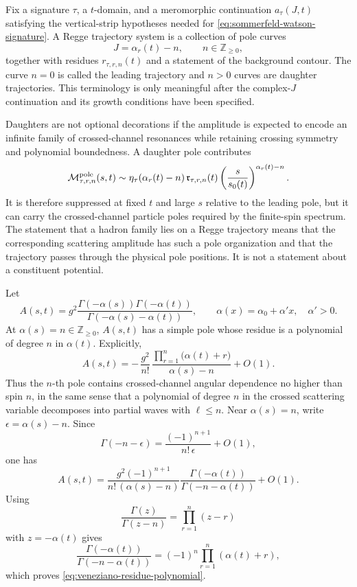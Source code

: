 \begin{definition}
\label{def:regge-trajectory-daughter-data}
Fix a signature \(\tau\), a \(t\)-domain, and a meromorphic continuation
\(a_\tau(J,t)\) satisfying the vertical-strip hypotheses needed for
\eqref{eq:sommerfeld-watson-signature}.  A Regge trajectory system is a
collection of pole curves
\[
  J=\alpha_r(t)-n,\qquad n\in \mathbb Z_{\ge0},
\]
together with residues \(r_{\tau,r,n}(t)\) and a statement of the background
contour.  The curve \(n=0\) is called the leading trajectory and \(n>0\)
curves are daughter trajectories.  This terminology is only meaningful after
the complex-\(J\) continuation and its growth conditions have been specified.
\end{definition}

Daughters are not optional decorations if the amplitude is expected to encode
an infinite family of crossed-channel resonances while retaining crossing
symmetry and polynomial boundedness.  A daughter pole contributes
\[
  \mathcal M_{\tau,r,n}^{\rm pole}(s,t)
  \sim
  \eta_\tau(\alpha_r(t)-n)\,
  \mathfrak r_{\tau,r,n}(t)
  \left(\frac{s}{s_0(t)}\right)^{\alpha_r(t)-n}.
\]
It is therefore suppressed at fixed \(t\) and large \(s\) relative to the
leading pole, but it can carry the crossed-channel particle poles required by
the finite-spin spectrum.  The statement that a hadron family lies on a Regge
trajectory means that the corresponding scattering amplitude has such a pole
organization and that the trajectory passes through the physical pole
positions.  It is not a statement about a constituent potential.

Let
\begin{equation}
  A(s,t)=g^2
  \frac{\Gamma(-\alpha(s))\Gamma(-\alpha(t))}
       {\Gamma(-\alpha(s)-\alpha(t))},
  \qquad
  \alpha(x)=\alpha_0+\alpha' x,\quad \alpha'>0 .
  \label{eq:veneziano-beta-amplitude}
\end{equation}
At \(\alpha(s)=n\in\mathbb Z_{\ge0}\), \(A(s,t)\) has a simple pole whose
residue is a polynomial of degree \(n\) in \(\alpha(t)\).  Explicitly,
\begin{equation}
  A(s,t)
  =
  -\,\frac{g^2}{n!}\,
  \frac{\prod_{r=1}^{n}\bigl(\alpha(t)+r\bigr)}
       {\alpha(s)-n}
  +O(1).
  \label{eq:veneziano-residue-polynomial}
\end{equation}
Thus the \(n\)-th pole contains crossed-channel angular dependence no higher
than spin \(n\), in the same sense that a polynomial of degree \(n\) in the
crossed scattering variable decomposes into partial waves with
\(\ell\le n\).
Near \(\alpha(s)=n\), write \(\epsilon=\alpha(s)-n\).  Since
\[
  \Gamma(-n-\epsilon)
  =
  \frac{(-1)^{n+1}}{n!\,\epsilon}+O(1),
\]
one has
\[
  A(s,t)
  =
  \frac{g^2(-1)^{n+1}}{n!\,(\alpha(s)-n)}
  \frac{\Gamma(-\alpha(t))}
       {\Gamma(-n-\alpha(t))}
  +O(1).
\]
Using
\[
  \frac{\Gamma(z)}{\Gamma(z-n)}
  =
  \prod_{r=1}^{n}(z-r)
\]
with \(z=-\alpha(t)\) gives
\[
  \frac{\Gamma(-\alpha(t))}
       {\Gamma(-n-\alpha(t))}
  =
  (-1)^n\prod_{r=1}^{n}(\alpha(t)+r),
\]
which proves \eqref{eq:veneziano-residue-polynomial}.

